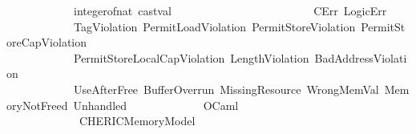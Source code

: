 \begin{isabellebody}
\ \ \ \ \ \ \ \ \ \ \ \ integer{\isacharunderscore}{\kern0pt}of{\isacharunderscore}{\kern0pt}nat\ cast{\isacharunderscore}{\kern0pt}val\isanewline
\ \ \ \ \ \ \ \ \ \ \ \ \isanewline
\ \ \ \ \ \ \ \ \ \ \ \ C{}Err\ LogicErr\isanewline
\ \ \ \ \ \ \ \ \ \ \ \ TagViolation\ PermitLoadViolation\ PermitStoreViolation\ PermitStoreCapViolation\isanewline
\ \ \ \ \ \ \ \ \ \ \ \ PermitStoreLocalCapViolation\ LengthViolation\ BadAddressViolation\isanewline
\ \ \ \ \ \ \ \ \ \ \ \ UseAfterFree\ BufferOverrun\ MissingResource\ WrongMemVal\ MemoryNotFreed\ Unhandled\isanewline
\ \ \ \ \ \ \ \ \ \ \ \ \ OCaml\ \isanewline
\ \ \ \ \ \ \ \ \ \ \ \ \ CHERI{\isacharunderscore}{\kern0pt}C{\isacharunderscore}{\kern0pt}Memory{\isacharunderscore}{\kern0pt}Model\isanewline
%
\isadelimtheory
\isanewline
%
\endisadelimtheory
%
\isatagtheory
{}\isamarkupfalse%
%
\endisatagtheory
{\isafoldtheory}%
%
\isadelimtheory
%
\endisadelimtheory
%
\end{isabellebody}%
\endinput
